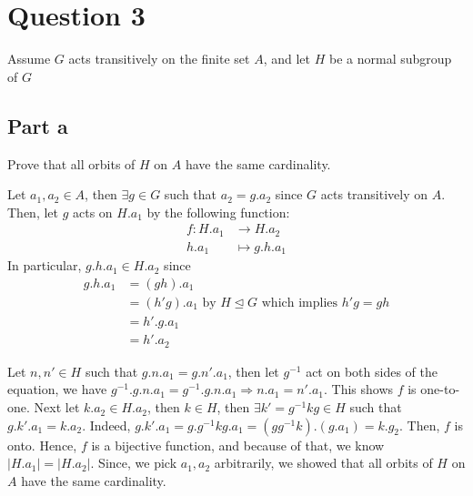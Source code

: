 \section{Question 3}

\begin{question}
    Assume $G$ acts transitively on the finite set $A$, and let $H$ be a normal subgroup of $G$
\end{question}

\subsection{Part a}

\begin{question}
    Prove that all orbits of $H$ on $A$ have the same cardinality.
\end{question}

\begin{answer}
    Let $a_1, a_2 \in A$, then $\exists g \in G$ such that $a_2 = g.a_2$ since $G$ acts transitively on $A$. Then, let $g$ acts on $H.a_1$ by the following function:
    \begin{equation}
        \begin{aligned}
            f: H.a_1 &\to H.a_2\\
            h.a_1 &\mapsto g.h.a_1
        \end{aligned}
    \end{equation}
    In particular, $g.h.a_1 \in H.a_2$ since 
    \begin{equation}
        \begin{aligned}
            g.h.a_1 &= (gh).a_1\\
            &= (h'g).a_1 \text{ by $H \trianglelefteq G$ which implies $h'g = gh$}\\
            &= h'.g.a_1\\
            &= h'.a_2
        \end{aligned}
    \end{equation}
    
    Let $n,n' \in H$ such that $g.n.a_1 = g.n'.a_1$, then let $g^{-1}$ act on both sides of the equation, we have $g^{-1}.g.n.a_1 = g^{-1}.g.n.a_1 \Rightarrow n.a_1 = n'.a_1$. This shows $f$ is one-to-one. Next let $k.a_2 \in H.a_2$, then $k \in H$, then $\exists k' = g^{-1}kg\in H$ such that $g.k'.a_1 =k.a_2$. Indeed, $g.k'.a_1 = g.g^{-1}kg.a_1 = (gg^{-1}k).(g.a_1) = k.g_2$. Then, $f$ is onto. Hence, $f$ is a bijective function, and because of that, we know $\lvert H.a_1 \rvert = \lvert H.a_2 \rvert$. Since, we pick $a_1,a_2$ arbitrarily, we showed that all orbits of $H$ on $A$ have the same cardinality.
\end{answer}

